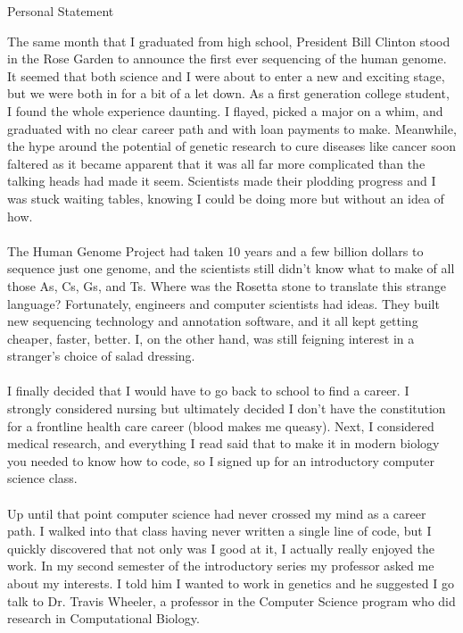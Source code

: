 \documentclass{article}
\begin{document}
\begin{center}
Personal Statement\\
\end{center}
The same month that I graduated from high school, President Bill Clinton stood in the Rose Garden to announce the first ever sequencing of the human genome.  It seemed that both science and I were about to enter a new and exciting stage, but we were both in for a bit of a let down.  As a first generation college student, I found the whole experience daunting.  I flayed, picked a major on a whim, and graduated with no clear career path and with loan payments to make.   Meanwhile, the hype around the potential of genetic research to cure diseases like cancer soon faltered as it became apparent that it was all far more complicated than the talking heads had made it seem.  Scientists made their plodding progress and I was stuck waiting tables, knowing I could be doing more but without an idea of how.\\
\\
The Human Genome Project had taken 10 years and a few billion dollars to sequence just one genome, and the scientists still didn’t know what to make of all those As, Cs, Gs, and Ts.  Where was the Rosetta stone to translate this strange language?  Fortunately, engineers and computer scientists had ideas.  They built new sequencing technology and annotation software, and it all kept getting cheaper, faster, better.  I, on the other hand, was still feigning interest in a stranger’s choice of salad dressing.\\
\\
I finally decided that I would have to go back to school to find a career.  I strongly considered nursing but ultimately decided I don’t have the constitution for a frontline health care career (blood makes me queasy).  Next, I considered medical research, and everything I read said that to make it in modern biology you needed to know how to code, so I signed up for an introductory computer science class. \\
\\ 
Up until that point computer science had never crossed my mind as a career path.  I walked into that class having never written a single line of code, but I quickly discovered that not only was I good at it, I actually really enjoyed the work.  In my second semester of the introductory series my professor asked me about my interests.  I told him I wanted to work in genetics and he suggested I go talk to Dr. Travis Wheeler, a professor in the Computer Science program who did research in Computational Biology.  \\
\end{document}

